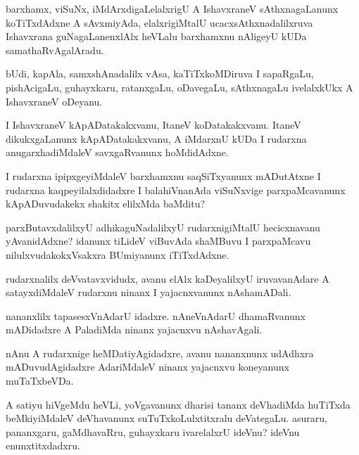 \documentclass{article}
\begin{document}
\begin{mn}
barxhamx, viSuNx, iMdArxdigaLelalxrigU A IshavxraneV sAthxnagaLanunx
koTiTxdAdxne A sAvxmiyAda, elalxrigiMtalU ucacxsAthxnadalilxruva
Ishavxrana guNagaLanenxlAlx heVLalu barxhamxnu nAligeyU kUDa samathaRvAgalAradu.
\end{mn}

\begin{mn}%
bUdi, kapAla, samxshAnadalilx vAsa, kaTiTxkoMDiruva I sapaRgaLu,
pishAcigaLu, guhayxkaru, ratanxgaLu, oDavegaLu, sAthxnagaLu
ivelalxkUkx A IshavxraneV oDeyanu.
\end{mn}

\begin{mn}%
I IshavxraneV kApADatakakxvanu, ItaneV koDatakakxvanu. ItaneV
dikukxgaLanunx kApADatakakxvanu, A iMdarxnU kUDa I rudarxna
anugarxhadiMdaleV savxgaRvanunx hoMdidAdxne.
\end{mn}

\begin{mn}
I rudarxna ipipxgeyiMdaleV barxhamxnu saqSiTxyanunx mADutAtxne I
rudarxna kaqpeyilalxdidadxre I balahiVnanAda viSuNxvige
parxpaMcavanunx kApADuvudakekx shakitx elilxMda baMditu?
\end{mn}

\begin{mn}
parxButavxdalilxyU adhikaguNadalilxyU rudarxnigiMtalU hecicxnavanu
yAvanidAdxne? idanunx tiLideV viBuvAda shaMBuvu I parxpaMcavu
nilulxvudakokxVsakxra BUmiyanunx iTiTxdAdxne.
\end{mn}

\begin{mn}
rudarxnalilx deVvatavxvidudx, avanu elAlx kaDeyalilxyU iruvavanAdare A
satayxdiMdaleV rudarxnu ninanx I yajacnxvanunx nAshamADali.
\end{mn}

\begin{mn}%
nananxlilx tapasesxVnAdarU idadxre. nAneVnAdarU dhamaRvanunx
mADidadxre A PaladiMda ninanx yajacnxvu nAshavAgali.
\end{mn}

\begin{mn}
nAnu A rudarxnige heMDatiyAgidadxre, avanu nananxnunx udAdhxra
mADuvudAgidadxre AdariMdaleV ninanx yajacnxvu koneyanunx muTaTxbeVDa.
\end{mn}

\begin{mn}%
A satiyu hiVgeMdu heVLi, yoVgavanunx dharisi tananx deVhadiMda
huTiTxda beMkiyiMdaleV deVhavanunx suTuTxkoLulxtitxralu
deVategaLu. asuraru, pananxgaru, gaMdhavaRru, guhayxkaru ivarelalxrU
ideVnu? ideVnu enunxtitxdadxru.
\end{mn}
\end{document}
